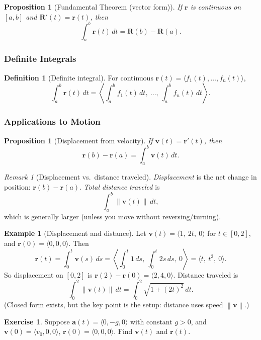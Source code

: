 \documentclass[12pt]{article}
\numberwithin{equation}{section}
\newcommand{\vect}[1]{\boldsymbol{#1}}   %
\newcommand{\norm}[1]{\left\lVert #1\right\rVert}
\theoremstyle{plain}
\newtheorem{proposition}[theorem]{Proposition}
\theoremstyle{definition}
\newtheorem{definition}[theorem]{Definition}
\newtheorem{example}[theorem]{Example}
\newtheorem{exercise}[theorem]{Exercise}
\theoremstyle{remark}
\newtheorem{remark}[theorem]{Remark}
\begin{document}
\begin{proposition}[Fundamental Theorem (vector form)]\label{prop:ftc-vector}
If $\vect r$ is continuous on $[a,b]$ and $\vect R'(t)=\vect r(t)$, then
\[
\int_a^b \vect r(t)\,dt=\vect R(b)-\vect R(a).
\]
\end{proposition}

\subsubsection{Definite Integrals}

\begin{definition}[Definite integral]\label{def:defint-vvf}
For continuous $\vect r(t)=\langle f_1(t),\dots,f_n(t)\rangle$,
\[
\int_a^b \vect r(t)\,dt
=
\left\langle \int_a^b f_1(t)\,dt,\ \dots,\ \int_a^b f_n(t)\,dt\right\rangle.
\]
\end{definition}

\subsubsection{Applications to Motion}

\begin{proposition}[Displacement from velocity]\label{prop:disp-from-vel}
If $\vect v(t)=\vect r'(t)$, then
\[
\vect r(b)-\vect r(a)=\int_a^b \vect v(t)\,dt.
\]
\end{proposition}

\begin{remark}[Displacement vs.\ distance traveled]
\emph{Displacement} is the net change in position: $\vect r(b)-\vect r(a)$.  
\emph{Total distance traveled} is
\[
\int_a^b \norm{\vect v(t)}\,dt,
\]
which is generally larger (unless you move without reversing/turning).
\end{remark}

\begin{example}[Displacement and distance]
Let $\vect v(t)=\langle 1,\ 2t,\ 0\rangle$ for $t\in[0,2]$, and $\vect r(0)=\langle 0,0,0\rangle$.
Then
\[
\vect r(t)=\int_0^t \vect v(s)\,ds
=
\left\langle \int_0^t 1\,ds,\ \int_0^t 2s\,ds,\ 0\right\rangle
=
\langle t,\ t^2,\ 0\rangle.
\]
So displacement on $[0,2]$ is $\vect r(2)-\vect r(0)=\langle 2,4,0\rangle$.
Distance traveled is
\[
\int_0^2 \norm{\vect v(t)}\,dt=\int_0^2 \sqrt{1+(2t)^2}\,dt.
\]
(Closed form exists, but the key point is the setup: distance uses speed $\norm{\vect v}$.)
\end{example}

\begin{exercise}
Suppose $\vect a(t)=\langle 0,-g,0\rangle$ with constant $g>0$, and $\vect v(0)=\langle v_0,0,0\rangle$, $\vect r(0)=\langle 0,0,0\rangle$.
Find $\vect v(t)$ and $\vect r(t)$.
\end{exercise}
\end{document}
